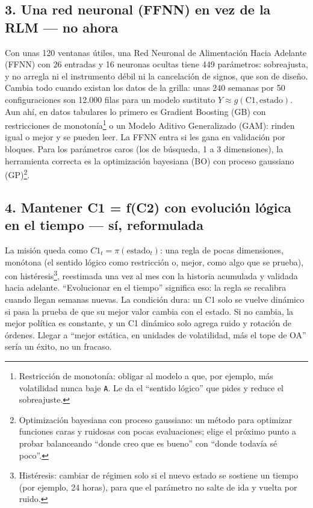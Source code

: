 \documentclass[11pt,a4paper]{article}
\newcommand{\code}[1]{\texttt{\small #1}}
\begin{document}
\subsection*{3. Una red neuronal (FFNN) en vez de la RLM — no ahora}
Con unas 120 ventanas útiles, una Red Neuronal de Alimentación Hacia Adelante (FFNN) con 26 entradas y 16
neuronas ocultas tiene 449 parámetros: sobreajusta, y no arregla ni el instrumento débil ni la cancelación
de signos, que son de diseño. Cambia todo cuando existan los datos de la grilla: unas 240 semanas por 50
configuraciones son 12.000 filas para un modelo sustituto $Y \approx g(\text{C1}, \text{estado})$. Aun ahí,
en datos tabulares lo primero es Gradient Boosting (GB) con restricciones de monotonía\footnote{Restricción
de monotonía: obligar al modelo a que, por ejemplo, más volatilidad nunca baje \code{A}. Le da el ``sentido
lógico'' que pides y reduce el sobreajuste.} o un Modelo Aditivo Generalizado (GAM): rinden igual o mejor y
se pueden leer. La FFNN entra si les gana en validación por bloques. Para los parámetros caros (los de
búsqueda, 1 a 3 dimensiones), la herramienta correcta es la optimización bayesiana (BO) con proceso
gaussiano (GP)\footnote{Optimización bayesiana con proceso gaussiano: un método para optimizar funciones
caras y ruidosas con pocas evaluaciones; elige el próximo punto a probar balanceando ``donde creo que es
bueno'' con ``donde todavía sé poco''.}.

\subsection*{4. Mantener C1 = f(C2) con evolución lógica en el tiempo — sí, reformulada}
La misión queda como $C1_t = \pi(\text{estado}_t)$: una regla de pocas dimensiones, monótona (el sentido
lógico como restricción o, mejor, como algo que se prueba), con histéresis\footnote{Histéresis: cambiar de
régimen solo si el nuevo estado se sostiene un tiempo (por ejemplo, 24 horas), para que el parámetro no
salte de ida y vuelta por ruido.}, reestimada una vez al mes con la historia acumulada y validada hacia
adelante. ``Evolucionar en el tiempo'' significa eso: la regla se recalibra cuando llegan semanas nuevas.
La condición dura: un C1 solo se vuelve dinámico si pasa la prueba de que su mejor valor cambia con el
estado. Si no cambia, la mejor política es constante, y un C1 dinámico solo agrega ruido y rotación de
órdenes. Llegar a ``mejor estática, en unidades de volatilidad, más el tope de OA'' sería un éxito, no un
fracaso.
\end{document}
